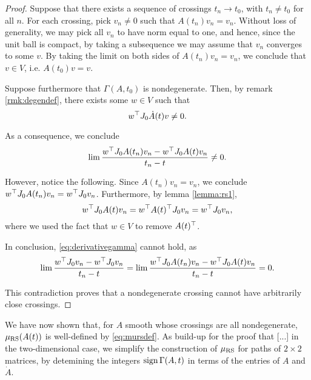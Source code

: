 \begin{proof}
Suppose that there exists a sequence of crossings $t_n \to t_0$, with $t_n \neq t_0$ for all $n$. For each crossing, pick $v_n \neq 0$ such that $A(t_n) v_n = v_n$. Without loss of generality, we may pick all $v_n$ to have norm equal to one, and hence, since the unit ball is compact, by taking a subsequence we may assume that $v_n$ converges to some $v$. By taking the limit on both sides of $A(t_n) v_n = v_n$, we conclude that $v \in V$, i.e. $A(t_0) v = v$.

Suppose furthermore that $\Gamma(A,t_0)$ is nondegenerate. Then, by remark \ref{rmk:degendef}, there exists some $w \in V$ such that
\begin{equation}
w^\top J_0 \dot A(t) v \neq 0.
\end{equation}

As a consequence, we conclude
\begin{equation}\label{eq:derivativegamma}
\lim \frac{w^\top J_0 A(t_n) v_n - w^\top J_0 A(t) v_n}{t_n - t} \neq 0.
\end{equation}

However, notice the following. Since $A(t_n) v_n = v_n$, we conclude $w^\top J_0 A(t_n) v_n = w^\top J_0 v_n$. Furthermore, by lemma \ref{lemma:rs1},
\begin{equation}
w^\top J_0 A(t) v_n = w^\top A(t)^\top J_0 v_n = w^\top J_0 v_n,
\end{equation}
where we used the fact that $w \in V$ to remove $A(t)^\top$.

In conclusion, \eqref{eq:derivativegamma} cannot hold, as
\begin{equation}
\lim \frac{w^\top J_0 v_n - w^\top J_0 v_n}{t_n - t} = \lim \frac{w^\top J_0 A(t_n) v_n - w^\top J_0 A(t) v_n}{t_n - t} = 0.
\end{equation}

This contradiction proves that a nondegenerate crossing cannot have arbitrarily close crossings.
\end{proof}

We have now shown that, for $A$ smooth whose crossings are all nondegenerate, $\mu_{\mathrm{RS}}(A(t))$ is well-defined by \eqref{eq:mursdef}. As build-up for the proof that [...] in the two-dimensional case, we simplify the construction of $\mu_{\mathrm{RS}}$ for paths of $2\times2$ matrices, by detemining the integers $\operatorname{sign} \Gamma(A,t)$ in terms of the entries of $A$ and $\dot A$.

